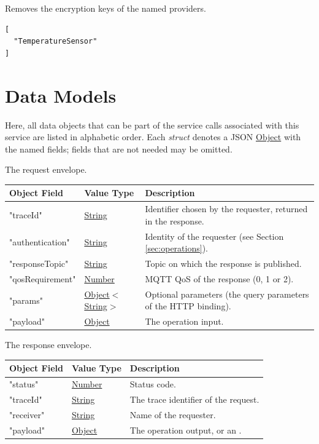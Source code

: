 \documentclass[a4paper]{arrowhead}
\newcommand{\mref}[2][]{{\textcolor{ArrowheadPurple}{\hyperref[sec:model:#2]{\ifstrempty{#1}{#2}{#1}}}}}
\newcommand{\oref}[1]{{\textcolor{ArrowheadBlue}{\hyperref[sec:operations:#1]{#1}}}}
\newcommand{\pref}[1]{{\textcolor{ArrowheadGrey}{\hyperref[sec:model:primitives:#1]{#1}}}}
\begin{document}
Removes the encryption keys of the named providers.

\begin{lstlisting}[caption={Payload of an \oref{remove-encryption-keys} request.}]
[
  "TemperatureSensor"
]
\end{lstlisting}

\newpage

\section{Data Models}
\label{sec:model}

Here, all data objects that can be part of the service calls associated with this service are listed in alphabetic order.
Each \textit{struct} denotes a JSON \pref{Object} with the named fields; fields that are not needed may be omitted.


The request envelope.

\noindent\begin{tabularx}{\textwidth}{| p{4.25cm} | p{3.5cm} | X |} \hline
\rowcolor{gray!33} Object Field & Value Type & Description \\ \hline
"traceId" & \pref{String} & Identifier chosen by the requester, returned in the response. \\ \hline
"authentication" & \pref{String} & Identity of the requester (see Section \ref{sec:operations}). \\ \hline
"responseTopic" & \pref{String} & Topic on which the response is published. \\ \hline
"qosRequirement" & \pref{Number} & MQTT QoS of the response (0, 1 or 2). \\ \hline
"params" & \pref{Object}$<$\pref{String}$>$ & Optional parameters (the query parameters of the HTTP binding). \\ \hline
"payload" & \pref{Object} & The operation input. \\ \hline
\end{tabularx}


The response envelope.

\noindent\begin{tabularx}{\textwidth}{| p{4.25cm} | p{3.5cm} | X |} \hline
\rowcolor{gray!33} Object Field & Value Type & Description \\ \hline
"status" & \pref{Number} & Status code. \\ \hline
"traceId" & \pref{String} & The trace identifier of the request. \\ \hline
"receiver" & \pref{String} & Name of the requester. \\ \hline
"payload" & \pref{Object} & The operation output, or an \mref{ErrorMessage}. \\ \hline
\end{tabularx}
\end{document}
